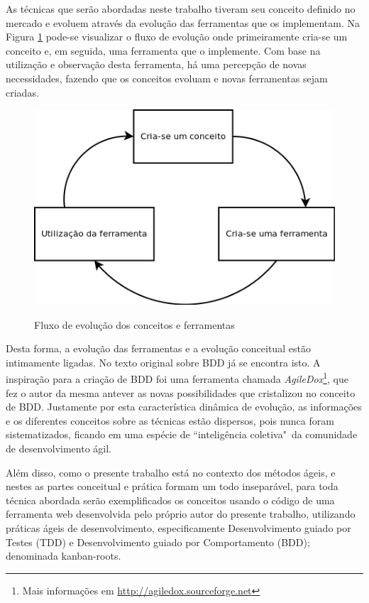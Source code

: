 As técnicas que serão abordadas neste trabalho tiveram seu conceito definido no mercado e evoluem através da evolução das ferramentas que os implementam. Na Figura \ref{img:fluxo_conceito_ferramenta} pode-se visualizar o fluxo de evolução onde primeiramente cria-se um conceito e, em seguida, uma ferramenta que o implemente. Com base na utilização e observação desta ferramenta, há uma percepção de novas necessidades, fazendo que os conceitos evoluam e novas ferramentas sejam criadas.

\begin{figure}[h]
  \center
  \caption{Fluxo de evolução dos conceitos e ferramentas}
  \includegraphics[scale=0.60]{images/fluxo-conceito-ferramenta}
  \label{img:fluxo_conceito_ferramenta}
\end{figure}

Desta forma, a evolução das ferramentas e a evolução conceitual estão intimamente ligadas. No texto original sobre BDD \cite{IntroducingBDD} já se encontra isto. A inspiração para a criação de BDD foi uma ferramenta chamada \textit{AgileDox}\footnote{Mais informações em \url{http://agiledox.sourceforge.net}}, que fez o autor da mesma antever as novas possibilidades que cristalizou no conceito de BDD. Justamente por esta característica dinâmica de evolução, as informações e os diferentes conceitos sobre as técnicas estão dispersos, pois nunca foram sistematizados, ficando em uma espécie de ``inteligência coletiva"\ da comunidade de desenvolvimento ágil.

Além disso, como o presente trabalho está no contexto dos métodos ágeis, e nestes as partes conceitual e prática formam um todo inseparável, para toda técnica abordada serão exemplificados os conceitos usando o código de uma ferramenta web desenvolvida pelo próprio autor do presente trabalho, utilizando práticas ágeis de desenvolvimento, especificamente Desenvolvimento guiado por Testes (TDD) e Desenvolvimento guiado por Comportamento (BDD); denominada kanban-roots.

